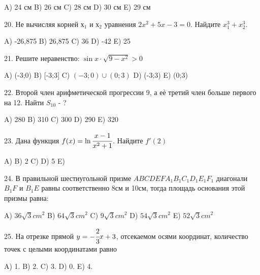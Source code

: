 \documentclass[12pt]{article}
\begin{document}
A) 24 см 
B) 26 см
C) 28 см
D) 30 см
E) 29 см

20. Не вычисляя корней $х_1$ и $х_2$ уравнения $2x^2+5x-3=0$. Найдите $x_1^3+x_2^3$.

A) -26,875
B) 26,875
C) 36
D) -42
E) 25

21. Решите неравенство: $\sin x \cdot \sqrt{9-x^2} > 0$

A) (-3;0)
B) [-3;3]
C) $(-3;0) \cup (0;3)$
D) (-3;3)
E) (0;3)

22. Второй член арифметической прогрессии 9, а еѐ третий член больше первого на 12. Найти $S_{10}$ - ?

A) 280
B) 310
C) 300
D) 290
E) 320

23. Дана функция $f(x)=\ln \cfrac{x-1}{x^2+1}$. Найдите $f'(2)$

A) 
B) 2
C) 
D) 5
E) 

24. В правильной шестиугольной призме $ABCDEFA_1B_1C_1D_1E_1F_1$ диагонали $B_1F$ и $B_1E$ равны соответственно 8см и 10см, тогда площадь основания этой призмы равна:

A) $36\sqrt{3} cm^2$
B) $64\sqrt{3} cm^2$
C) $9\sqrt{3} cm^2$
D) $54\sqrt{3} cm^2$
E) $52\sqrt{3} cm^2$

25. На отрезке прямой $y=-\cfrac{2}{3}x+3$, отсекаемом осями координат, количество точек с целыми координатами равно

A) 1.
B) 2.
C) 3.
D) 0.
E) 4.
\end{document}
